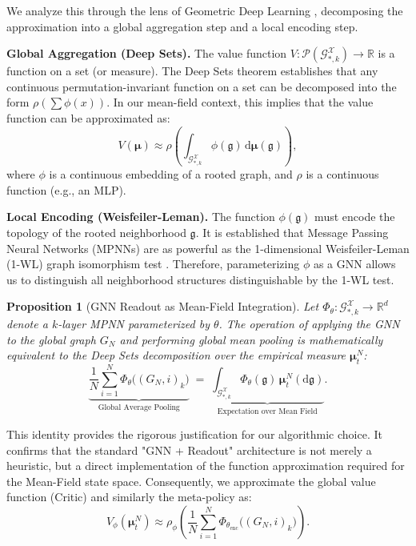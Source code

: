 \documentclass{article}
\newtheorem{proposition}{Proposition}
\begin{document}
We analyze this through the lens of Geometric Deep Learning \cite{bronstein2021geometric}, decomposing the approximation into a global aggregation step and a local encoding step.

\noindent\textbf{Global Aggregation (Deep Sets).}
The value function $V: \mathcal{P}(\mathcal{G}_{*,k}^{\mathcal{X}}) \to \mathbb{R}$ is a function on a set (or measure). The Deep Sets theorem \cite{zaheer2017deep} establishes that any continuous permutation-invariant function on a set can be decomposed into the form $\rho(\sum \phi(x))$. In our mean-field context, this implies that the value function can be approximated as:
\begin{equation}
    V(\boldsymbol{\mu}) \approx \rho \left( \int_{\mathcal{G}_{*,k}^{\mathcal{X}}} \phi(\mathfrak{g}) \, \mathrm{d}\boldsymbol{\mu}(\mathfrak{g}) \right),
\end{equation}
where $\phi$ is a continuous embedding of a rooted graph, and $\rho$ is a continuous function (e.g., an MLP).

\noindent\textbf{Local Encoding (Weisfeiler-Leman).}
The function $\phi(\mathfrak{g})$ must encode the topology of the rooted neighborhood $\mathfrak{g}$. It is established that Message Passing Neural Networks (MPNNs) are as powerful as the 1-dimensional Weisfeiler-Leman (1-WL) graph isomorphism test \cite{xu2018how,morris2019weisfeiler,maron2019provably}. Therefore, parameterizing $\phi$ as a GNN allows us to distinguish all neighborhood structures distinguishable by the 1-WL test.

\begin{proposition}[GNN Readout as Mean-Field Integration]
Let $\Phi_\theta: \mathcal{G}_{*,k}^{\mathcal{X}} \to \mathbb{R}^d$ denote a $k$-layer MPNN parameterized by $\theta$. The operation of applying the GNN to the global graph $G_N$ and performing global mean pooling is mathematically equivalent to the Deep Sets decomposition over the empirical measure $\boldsymbol{\mu}^N_t$:
\begin{equation}
    \label{eq:gnn_integration}
    \underbrace{\frac{1}{N} \sum_{i=1}^N \Phi_\theta\bigl( (G_N, i)_k \bigr)}_{\text{Global Average Pooling}} 
    \;=\; 
    \underbrace{\int_{\mathcal{G}_{*,k}^{\mathcal{X}}} \Phi_\theta(\mathfrak{g}) \, \boldsymbol{\mu}^N_t(\mathrm{d}\mathfrak{g})}_{\text{Expectation over Mean Field}}.
\end{equation}
\end{proposition}

This identity provides the rigorous justification for our algorithmic choice. It confirms that the standard "GNN + Readout" architecture is not merely a heuristic, but a direct implementation of the function approximation required for the Mean-Field state space.
Consequently, we approximate the global value function (Critic) and similarly the meta-policy as:
\begin{equation}
    V_\phi(\boldsymbol{\mu}^N_t) \approx \rho_\phi \left( \frac{1}{N} \sum_{i=1}^N \Phi_{\theta_{\text{enc}}}\bigl( (G_N, i)_k \bigr) \right).
\end{equation}
\end{document}
